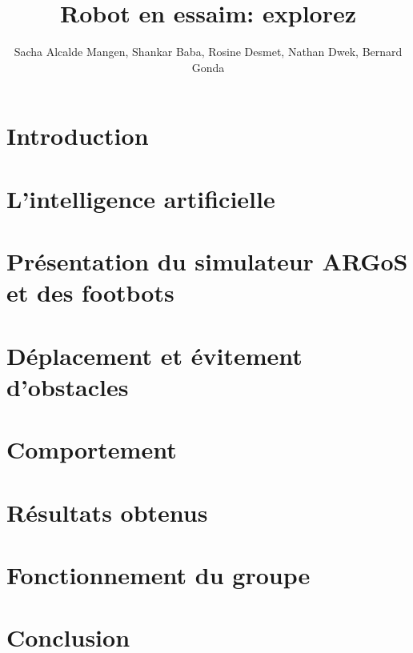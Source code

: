 \documentclass[a4paper,11pt]{report}
\title{Robot en essaim: explorez}
\author{Sacha Alcalde Mangen, Shankar Baba, Rosine Desmet, Nathan Dwek, Bernard Gonda}
\begin{document}


\begin{abstract}

\end{abstract}

\begin{abstract}

\end{abstract}

\tableofcontents

\chapter{Introduction}


\chapter{L'intelligence artificielle\label{chap:AI}}



\chapter[ARGoS et les footbots]{Présentation du simulateur ARGoS et des footbots\label{chap:argosFootbot}}


\chapter{Déplacement et évitement d'obstacles \label{chap:move}}


\chapter{Comportement}


\chapter{Résultats obtenus}


\chapter{Fonctionnement du groupe}


\chapter{Conclusion}


\listofalgorithms


\lstlistoflistings


\listoffigures


\nocite{*}



\end{document}
